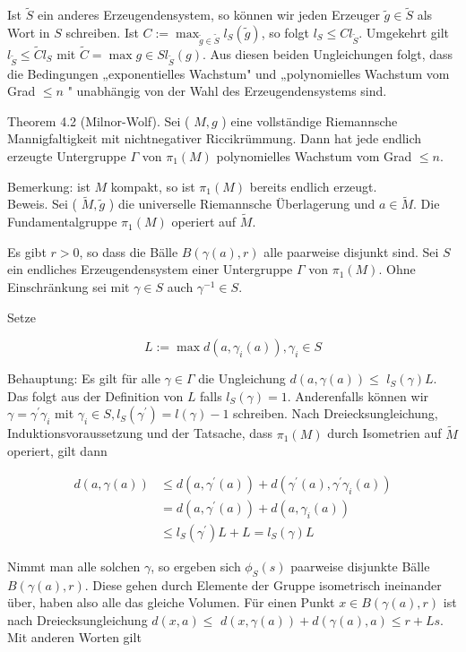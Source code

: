 \documentclass[10pt, letterpaper]{article}
\begin{document}
Ist $\widetilde{S}$ ein anderes Erzeugendensystem, so können wir jeden Erzeuger $\tilde{g} \in \tilde{S}$ als Wort in $S$ schreiben. Ist $C:=\max _{\tilde{g} \in \tilde{S}} l_{S}(\tilde{g})$, so folgt $l_{S} \leq C l_{\tilde{S}}$. Umgekehrt gilt $l_{\tilde{S}} \leq \tilde{C} l_{S}$ mit $\tilde{C}=\max g \in S l_{\tilde{S}}(g)$. Aus diesen beiden Ungleichungen folgt, dass die Bedingungen „exponentielles Wachstum" und „polynomielles Wachstum vom Grad $\leq n$ " unabhängig von der Wahl des Erzeugendensystems sind.

Theorem 4.2 (Milnor-Wolf). Sei ( $M, g$ ) eine vollständige Riemannsche Mannigfaltigkeit mit nichtnegativer Riccikrümmung. Dann hat jede endlich erzeugte Untergruppe $\Gamma$ von $\pi_{1}(M)$ polynomielles Wachstum vom Grad $\leq n$.

Bemerkung: ist $M$ kompakt, so ist $\pi_{1}(M)$ bereits endlich erzeugt.\\
Beweis. Sei ( $\tilde{M}, \tilde{g}$ ) die universelle Riemannsche Überlagerung und $a \in \tilde{M}$. Die Fundamentalgruppe $\pi_{1}(M)$ operiert auf $\tilde{M}$.

Es gibt $r>0$, so dass die Bälle $B(\gamma(a), r)$ alle paarweise disjunkt sind. Sei $S$ ein endliches Erzeugendensystem einer Untergruppe $\Gamma$ von $\pi_{1}(M)$. Ohne Einschränkung sei mit $\gamma \in S$ auch $\gamma^{-1} \in S$.

Setze

$$
L:=\max d\left(a, \gamma_{i}(a)\right), \gamma_{i} \in S
$$

Behauptung: Es gilt für alle $\gamma \in \Gamma$ die Ungleichung $d(a, \gamma(a)) \leq$ $l_{S}(\gamma) L$. Das folgt aus der Definition von $L$ falls $l_{S}(\gamma)=1$. Anderenfalls können wir $\gamma=\gamma^{\prime} \gamma_{i}$ mit $\gamma_{i} \in S, l_{S}\left(\gamma^{\prime}\right)=l(\gamma)-1$ schreiben. Nach Dreiecksungleichung, Induktionsvoraussetzung und der Tatsache, dass $\pi_{1}(M)$ durch Isometrien auf $\tilde{M}$ operiert, gilt dann

$$
\begin{aligned}
d(a, \gamma(a)) & \leq d\left(a, \gamma^{\prime}(a)\right)+d\left(\gamma^{\prime}(a), \gamma^{\prime} \gamma_{i}(a)\right) \\
& =d\left(a, \gamma^{\prime}(a)\right)+d\left(a, \gamma_{i}(a)\right) \\
& \leq l_{S}\left(\gamma^{\prime}\right) L+L=l_{S}(\gamma) L
\end{aligned}
$$

Nimmt man alle solchen $\gamma$, so ergeben sich $\phi_{S}(s)$ paarweise disjunkte Bälle $B(\gamma(a), r)$. Diese gehen durch Elemente der Gruppe isometrisch ineinander über, haben also alle das gleiche Volumen. Für einen Punkt $x \in B(\gamma(a), r)$ ist nach Dreiecksungleichung $d(x, a) \leq$ $d(x, \gamma(a))+d(\gamma(a), a) \leq r+L s$. Mit anderen Worten gilt
\end{document}
